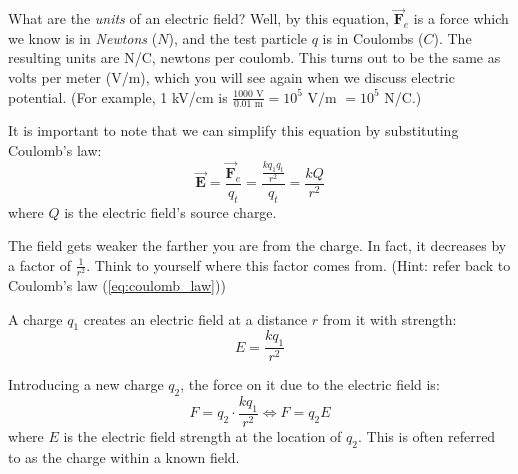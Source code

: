What are the \textit{units} of an electric field? Well, by this equation, $\vec{\mathbf{F}}_e$ is a force which we know is in \textit{Newtons} ($N$), and the test particle $q$ is in Coulombs ($C$). The resulting units are N/C, newtons per coulomb.
This turns out to be the same as volts per meter (V/m), which you will see
again when we discuss electric potential. (For example, 1 kV/cm is
$\frac{1000 \text{ V}}{0.01 \text{ m}} = 10^5$ V/m $= 10^5$ N/C.)

It is important to note that we can simplify this equation by substituting Coulomb's law:
\begin{equation}
	\vec{\mathbf{E}} = \frac{\vec{\mathbf{F}}_e}{q_t} = \frac{\frac{kq_1q_t}{r^2}}{q_t} = \frac{kQ}{r^2}
\end{equation}
where $Q$ is the electric field's source charge.

The field gets weaker the farther you are from the charge. In fact, it decreases by a factor of $\frac{1}{r^2}$. Think to yourself where this factor comes from. (Hint: refer back to Coulomb's law (\ref{eq:coulomb_law}))

\begin{mdframed}[frametitle = {Electric Field Force from a singular charge to a second charge}, style = important]

	A charge $q_1$ creates an electric field at a distance $r$ from it with strength:
	\begin{equation}
		E = \frac{kq_1}{r^2}
	\end{equation}

	Introducing a new charge $q_2$, the force on it due to the electric field is:
	\begin{equation}
		F = q_2 \cdot \frac{kq_1}{r^2} \iff F = q_2 E
	\end{equation}
	where $E$ is the electric field strength at the location of $q_2$. This is often referred to as the charge within a known field.
\end{mdframed}

